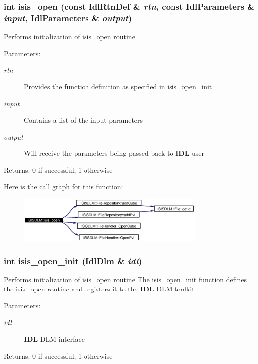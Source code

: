 \subsubsection{\setlength{\rightskip}{0pt plus 5cm}int isis\_\-open (const Idl\-Rtn\-Def \& {\em rtn}, const Idl\-Parameters \& {\em input}, Idl\-Parameters \& {\em output})}\label{namespaceISISDLM_a20}


Performs initialization of isis\_\-open routine \begin{Desc}
\item[Parameters:]
\begin{description}
\item[{\em rtn}]Provides the function definition as specified in isis\_\-open\_\-init \item[{\em input}]Contains a list of the input parameters \item[{\em output}]Will receive the parameters being passed back to {\bf IDL} user \end{description}
\end{Desc}
\begin{Desc}
\item[Returns:]0 if successful, 1 otherwise \end{Desc}


Here is the call graph for this function:\begin{figure}[H]
\begin{center}
\leavevmode
\includegraphics[width=258pt]{namespaceISISDLM_a20_cgraph}
\end{center}
\end{figure}
\subsubsection{\setlength{\rightskip}{0pt plus 5cm}int isis\_\-open\_\-init (Idl\-Dlm \& {\em idl})}\label{namespaceISISDLM_a19}


Performs initialization of isis\_\-open routine The isis\_\-open\_\-init function defines the isis\_\-open routine and registers it to the {\bf IDL} DLM toolkit. \begin{Desc}
\item[Parameters:]
\begin{description}
\item[{\em idl}]{\bf IDL} DLM interface \end{description}
\end{Desc}
\begin{Desc}
\item[Returns:]0 if successful, 1 otherwise \end{Desc}


